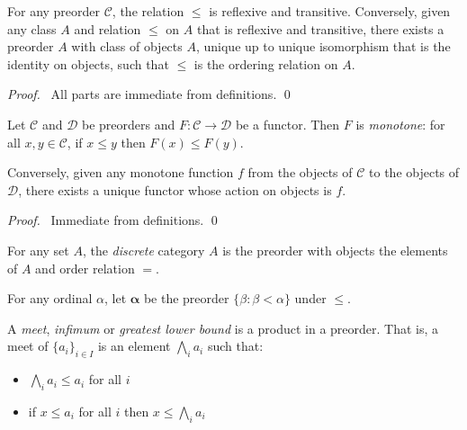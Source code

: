 \begin{prop}
For any preorder $\mathcal{C}$, the relation $\leq$ is reflexive and transitive. Conversely, given any class $A$ and relation $\leq$ on $A$ that is reflexive and transitive, there exists a preorder $A$ with class of objects $A$, unique up to unique isomorphism that is the identity on objects, such that $\leq$ is the ordering relation on $A$.
\end{prop}

\begin{proof}
\pf\ All parts are immediate from definitions. \qed
\end{proof}

\begin{prop}
Let $\mathcal{C}$ and $\mathcal{D}$ be preorders and $F : \mathcal{C} \rightarrow \mathcal{D}$ be a functor. Then $F$ is \emph{monotone}: for all $x,y \in \mathcal{C}$, if $x \leq y$ then $F(x) \leq F(y)$.

Conversely, given any monotone function $f$ from the objects of $\mathcal{C}$ to the objects of $\mathcal{D}$, there exists a unique functor whose action on objects is $f$.
\end{prop}

\begin{proof}
\pf\ Immediate from definitions. \qed
\end{proof}

\begin{ex}
For any set $A$, the \emph{discrete} category $A$ is the preorder with objects the elements of $A$ and order relation $=$.
\end{ex}

\begin{ex}
For any ordinal $\alpha$, let $\mathbf{\alpha}$ be the preorder $\{ \beta : \beta < \alpha \}$ under $\leq$.
\end{ex}




\begin{df}
A \emph{meet}, \emph{infimum} or \emph{greatest lower bound} is a product in a preorder. That is, a meet of $\{ a_i \}_{i \in I}$ is an element $\bigwedge_i a_i$ such that:
\begin{itemize}
\item $\bigwedge_i a_i \leq a_i$ for all $i$
\item if $x \leq a_i$ for all $i$ then $x \leq \bigwedge_i a_i$
\end{itemize}
\end{df}


